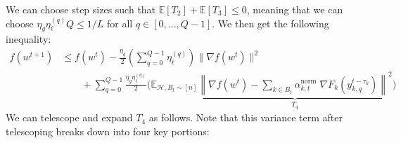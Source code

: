 \documentclass{article}
\begin{document}
We can choose step sizes such that $\mathbb{E}[T_2] + \mathbb{E}[T_3] \leq 0$, meaning that we can choose $\eta_g \eta_\ell^{(q)} Q \leq 1 / L$ for all $q \in [0, ..., Q-1]$. We then get the following inequality:
\begin{align*}
    f(w^{t+1})
    &\leq f(w^{t}) 
    -\frac{\eta_g}{2}\left(
        \sum_{q=0}^{Q-1}{\eta_\ell^{(q)}} \right) {\| \nabla f(w^t) \|^2} 
    \\    
    &\qquad + 
    \sum_{q=0}^{Q-1}{
            \frac{
                \eta_g \eta_\ell^{(q)}
            }{
                2            
            }}\bigg(
    \mathbb{E}_{\mathcal{H}, B_t \sim [n]} 
    \underbrace{\left\|
        \nabla f(w^t) - \sum_{k \in B_t}{
            \alpha^{\text{norm}}_{k, t} \; \nabla F_k(y_{k, q}^{t - \tau_k})
        }
    \right\|^2}_{T_4}
    \bigg)
\end{align*}
We can telescope and expand $T_4$ as follows. Note that this variance term after telescoping breaks down into four key portions:
\allowdisplaybreaks
\end{document}
